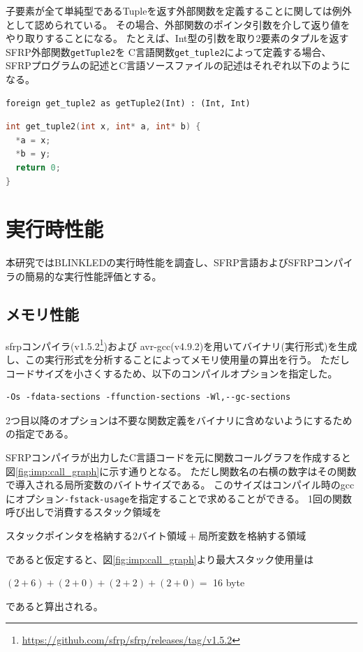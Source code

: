 子要素が全て単純型であるTupleを返す外部関数を定義することに関しては例外として認められている。
その場合、外部関数のポインタ引数を介して返り値をやり取りすることになる。
たとえば、Int型の引数を取り2要素のタプルを返すSFRP外部関数\texttt{getTuple2}を
C言語関数\texttt{get\_tuple2}によって定義する場合、
SFRPプログラムの記述とC言語ソースファイルの記述はそれぞれ以下のようになる。
\begin{lstlisting}[basicstyle=\ttfamily\small,language=SFRP]
foreign get_tuple2 as getTuple2(Int) : (Int, Int)
\end{lstlisting}
\begin{lstlisting}[basicstyle=\ttfamily\small,language=C]
int get_tuple2(int x, int* a, int* b) {
  *a = x;
  *b = y;
  return 0;
}
\end{lstlisting}


\section{実行時性能}\label{sec:implementation:performance}
本研究ではBLINKLEDの実行時性能を調査し、SFRP言語およびSFRPコンパイラの簡易的な実行性能評価とする。

\subsection{メモリ性能}
sfrpコンパイラ(v1.5.2\footnote{\url{https://github.com/sfrp/sfrp/releases/tag/v1.5.2}})および
avr-gcc(v4.9.2)を用いてバイナリ(実行形式)を生成し、この実行形式を分析することによってメモリ使用量の算出を行う。
ただしコードサイズを小さくするため、以下のコンパイルオプションを指定した。
\begin{lstlisting}[basicstyle=\ttfamily\small,numbers=none,frame=none]
-Os -fdata-sections -ffunction-sections -Wl,--gc-sections
\end{lstlisting}
2つ目以降のオプションは不要な関数定義をバイナリに含めないようにするための指定である。

SFRPコンパイラが出力したC言語コードを元に関数コールグラフを作成すると図\ref{fig:imp:call_graph}に示す通りとなる。
ただし関数名の右横の数字はその関数で導入される局所変数のバイトサイズである。
このサイズはコンパイル時のgccにオプション\texttt{-fstack-usage}を指定することで求めることができる。
1回の関数呼び出しで消費するスタック領域を
\begin{center}
$スタックポインタを格納する2バイト領域 + 局所変数を格納する領域$
\end{center}
であると仮定すると、図\ref{fig:imp:call_graph}より最大スタック使用量は
\begin{center}
$(2 + 6) + (2 + 0) + (2 + 2) + (2 + 0) =$ 16 byte\\
\end{center}
であると算出される。

